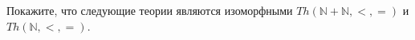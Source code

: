 Покажите, что следующие теории являются изоморфными $Th(\mathbb{N} + \mathbb{N}, <, =)$ и $Th(\mathbb{N}, <, =)$.